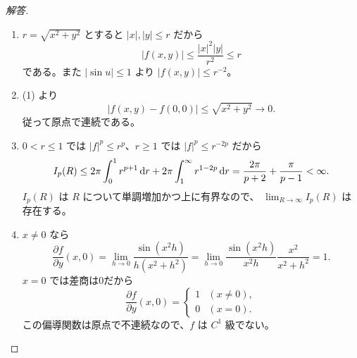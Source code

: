 \begin{proof}[解答]
\begin{enumerate}
  \item[(1)] $r=\sqrt{x^2+y^2}$ とすると $|x|,|y|\le r$ だから
  \[
  |f(x,y)|\le\frac{|x|^2|y|}{r^2}\le r
  \]
  である。また $|\sin u|\le1$ より $|f(x,y)|\le r^{-2}$。

  \item[(2)] (1) より
  \[
  |f(x,y)-f(0,0)|\le\sqrt{x^2+y^2}\longrightarrow0.
  \]
  従って原点で連続である。

  \item[(3)] $0<r\le1$ では $|f|^p\le r^p$、$r\ge1$ では
  $|f|^p\le r^{-2p}$ だから
  \[
  I_p(R)\le
  2\pi\int_0^1r^{p+1}\,\mathrm{d} r+
  2\pi\int_1^\infty r^{1-2p}\,\mathrm{d} r
  =\frac{2\pi}{p+2}+\frac{\pi}{p-1}<\infty.
  \]
  $I_p(R)$ は $R$ について単調増加かつ上に有界なので、
  $\lim_{R\to\infty}I_p(R)$ は存在する。

  \item[(4)] $x\ne0$ なら
  \[
  \frac{\partial f}{\partial y}(x,0)
  =\lim_{h\to0}\frac{\sin(x^2h)}{h(x^2+h^2)}
  =\lim_{h\to0}\frac{\sin(x^2h)}{x^2h}\frac{x^2}{x^2+h^2}=1.
  \]
  $x=0$ では差商は0だから
  \[
  \frac{\partial f}{\partial y}(x,0)=
  \begin{cases}1&(x\ne0),\\0&(x=0).\end{cases}
  \]
  この偏導関数は原点で不連続なので、$f$ は $C^1$ 級でない。
\end{enumerate}
\end{proof}

